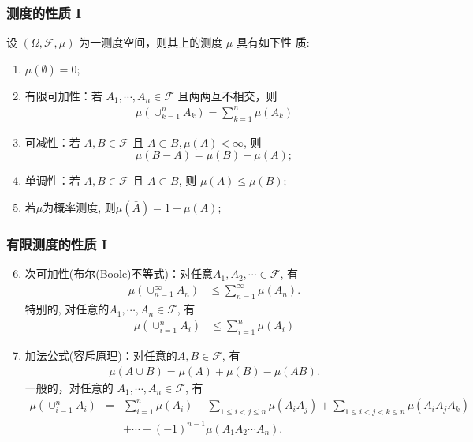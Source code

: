 \documentclass[Prob-All.tex]{subfiles}
\begin{document}
\begin{frame}%
	\frametitle{测度的性质 I}
	\begin{thm}
		设 $(\Omega,\mathcal{F},\mu)$ 为一测度空间，则其上的测度 $\mu$ 具有如下性
		质:
		\begin{enumerate}[<+-|alert@+>]
			\item $\mu(\emptyset)=0$;
			\item 有限可加性：若 $A_1,\cdots, A_n\in \mathcal{F}$ 且两两互不相交，则
			      \begin{eqnarray*}
				      \mu(\cup_{k=1}^n A_k)=\sum_{k=1}^n\mu(A_k)
			      \end{eqnarray*}
			\item 可减性：若 $A, B\in \mathcal{F}$ 且 $A\subset
				      B, \mu(A)<\infty$, 则 $$\mu(B-A)=\mu(B)-\mu(A);$$
			\item 单调性：若 $A, B\in \mathcal{F}$ 且 $A\subset B$,
			      则 $\mu(A)\leq \mu(B)$;
			\item 若$\mu$为概率测度, 则$\mu(\bar{A})=1-\mu(A)$;
		\end{enumerate}
	\end{thm}
\end{frame}
\begin{frame}
	\frametitle{有限测度的性质 I}

	\begin{enumerate}[<+-|alert@+>]
		\setcounter{enumi}{5}
\item 次可加性(布尔(Boole)不等式)：对任意$A_1, A_2, \cdots\in \mathcal{F}$, 有
		     \begin{align*}
			      \mu(\cup_{n=1}^{\infty}A_n)&\leq \sum_{n=1}^{\infty}\mu(A_n).
		      \end{align*}
			  特别的, 对任意的$A_1,\cdots, A_n\in\mathcal{F}$, 有
		      \begin{eqnarray*}
			      \mu(\cup_{i=1}^{n}A_i)&\leq \sum_{i=1}^{n}\mu(A_i)
		      \end{eqnarray*}
		\item 加法公式(容斥原理)：对任意的$A,B\in\mathcal{F}$, 有
		      \begin{eqnarray}\label{eq:plusformulatwo}
			      \mu(A\cup B)=\mu(A)+\mu(B)-\mu(AB).
		      \end{eqnarray}
		      一般的，对任意的 $A_1,\cdots,A_n\in \mathcal{F}$, 有
		      {\small \begin{eqnarray}
			      \label{eq:plusformula}
			      \mu(\cup_{i=1}^nA_i)&=&\sum_{i=1}^n\mu(A_i)-\sum_{1\leq i<j\leq n}\mu(A_iA_j)+\sum_{1\leq i<j<k\leq n}\mu(A_iA_jA_k)\nonumber\\
			      && +\cdots+(-1)^{n-1}\mu(A_1A_2\cdots A_n).
		      \end{eqnarray}}

	\end{enumerate}

\end{frame}
\end{document}
